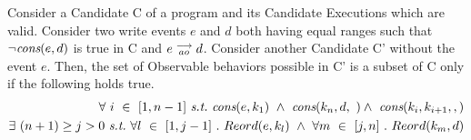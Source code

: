 \begin{corollary}
    Consider a Candidate C of a program and its Candidate Executions which are valid. Consider two write events $e$ and $d$ both having equal ranges such that $\neg \textit{cons}(e,d)$ is true in C and $e\stackrel{\longrightarrow}{_{ao}}d$. 
    Consider another Candidate C' without the event $e$.  
    Then, the set of Observable behaviors possible in C' is a subset of C only if the following holds true.
    \begin{align*}
        \forall \ i \ \in \ [1,n-1] \ \textit{s.t.} \
        \cons{e}{k_1} \ \wedge \ \cons{k_n, d} \ \wedge \ \cons{k_i, k_{i+1}}, \\
        \exists \ (n + 1) \geq j > 0 \ \textit{s.t.} \ 
        \forall l \ \in \ [1,j-1] \ . \ Reord(e, k_l) \ 
        \wedge \ 
        \forall m \ \in \ [j,n] \ . \ Reord(k_m, d) 
    \end{align*}
            
    
\end{corollary}

